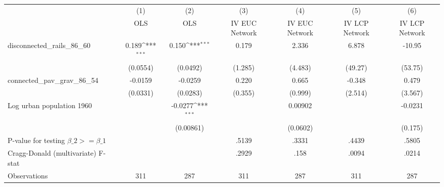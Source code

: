 {
\def\sym#1{\ifmmode^{#1}\else\(^{#1}\)\fi}
\begin{tabular}{l*{6}{c}}
\hline\hline
                &\multicolumn{1}{c}{(1)}&\multicolumn{1}{c}{(2)}&\multicolumn{1}{c}{(3)}&\multicolumn{1}{c}{(4)}&\multicolumn{1}{c}{(5)}&\multicolumn{1}{c}{(6)}\\
                &\multicolumn{1}{c}{OLS}&\multicolumn{1}{c}{OLS}&\multicolumn{1}{c}{IV EUC Network}&\multicolumn{1}{c}{IV EUC Network}&\multicolumn{1}{c}{IV LCP Network}&\multicolumn{1}{c}{IV LCP Network}\\
\hline
disconnected\_rails\_86\_60&    0.189\sym{***}&    0.150\sym{***}&    0.179         &    2.336         &    6.878         &   -10.95         \\
                & (0.0554)         & (0.0492)         &  (1.285)         &  (4.483)         &  (49.27)         &  (53.75)         \\
[1em]
connected\_pav\_grav\_86\_54&  -0.0159         &  -0.0259         &    0.220         &    0.665         &   -0.348         &    0.479         \\
                & (0.0331)         & (0.0283)         &  (0.355)         &  (0.999)         &  (2.514)         &  (3.567)         \\
[1em]
Log urban population 1960&                  &  -0.0277\sym{***}&                  &  0.00902         &                  &  -0.0231         \\
                &                  &(0.00861)         &                  & (0.0602)         &                  &  (0.175)         \\
\hline
P-value for testing $\beta\_{2} >= \beta\_{1}$&                  &                  &    .5139         &    .3331         &    .4439         &    .5805         \\
Cragg-Donald (multivariate) F-stat&                  &                  &    .2929         &     .158         &    .0094         &    .0214         \\
Observations    &      311         &      287         &      311         &      287         &      311         &      287         \\
\hline\hline
\end{tabular}
}
